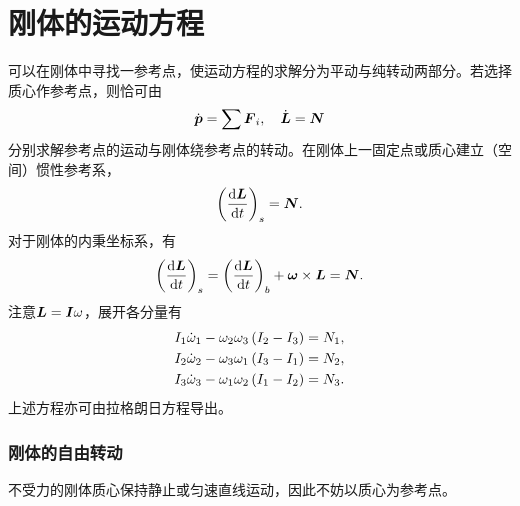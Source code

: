 \documentclass{ctexart}
\begin{document}
\section{刚体的运动方程}
可以在刚体中寻找一参考点，使运动方程的求解分为平动与纯转动两部分。若选择质心作参考点，则恰可由
\[ \dot{\boldsymbol{p}} = \sum \boldsymbol{F}_i, \quad \dot{\boldsymbol{L}} = \boldsymbol{N} \]
分别求解参考点的运动与刚体绕参考点的转动。在刚体上一固定点或质心建立（空间）惯性参考系，
\[ \left(\frac{\mathrm{d} \boldsymbol{L}}{\mathrm{d} t}\right)_s = \boldsymbol{N}. \]
对于刚体的内秉坐标系，有
\[ \left(\frac{\mathrm{d} \boldsymbol{L}}{\mathrm{d} t}\right)_s = \left(\frac{\mathrm{d} \boldsymbol{L}}{\mathrm{d} t}\right)_b+\boldsymbol{\omega}\times\boldsymbol{L} = \boldsymbol{N}. \]
注意$\boldsymbol{L}=\boldsymbol{I}\omega$，展开各分量有
\begin{align*}
I_1\dot{\omega}_1-\omega_2\omega_3\left(I_2-I_3\right)&=N_1,\\
I_2\dot{\omega}_2-\omega_3\omega_1\left(I_3-I_1\right)&=N_2,\\
I_3\dot{\omega}_3-\omega_1\omega_2\left(I_1-I_2\right)&=N_3.
\end{align*}
上述方程亦可由拉格朗日方程导出。
\subsubsection{刚体的自由转动}
不受力的刚体质心保持静止或匀速直线运动，因此不妨以质心为参考点。
\end{document}
